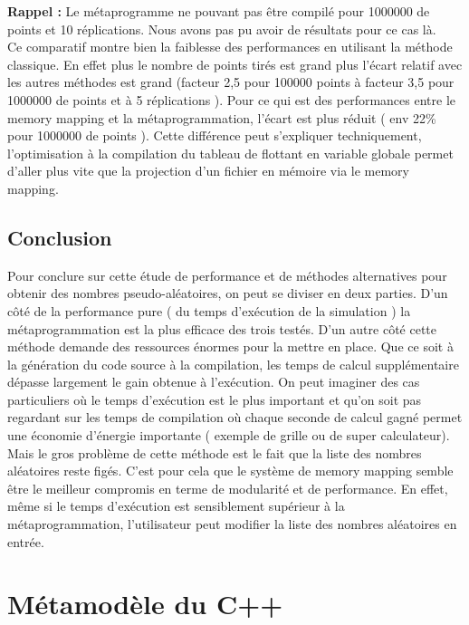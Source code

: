 \documentclass[a4paper,11pt]{report}
\begin{document}
\normalsize{
{\bf Rappel :} Le métaprogramme ne pouvant pas être compilé pour 1000000 de points et 10 réplications. Nous avons pas pu avoir de résultats pour ce cas là. \\

Ce comparatif montre bien la faiblesse des performances en utilisant la méthode classique. En effet plus le nombre de points tirés est grand plus l'écart relatif avec les autres méthodes est grand (facteur 2,5 pour 100000 points à  facteur 3,5 pour 1000000 de points et à 5 réplications ). Pour ce qui est des performances entre le memory mapping et la métaprogrammation, l'écart est plus réduit ( env 22\% pour 1000000 de points ). Cette différence peut s'expliquer techniquement, l'optimisation à la compilation du tableau de flottant en variable globale permet d'aller plus vite que la projection d'un fichier en mémoire via le memory mapping. 
}

\section{Conclusion}

\normalsize{
Pour conclure sur cette étude de performance et de méthodes alternatives pour obtenir des nombres pseudo-aléatoires, on peut se diviser en deux parties. D'un côté de la performance pure ( du temps d'exécution de la simulation ) la métaprogrammation est la plus efficace des trois testés. D'un autre côté cette méthode demande des ressources énormes pour la mettre en place. Que ce soit à la génération du code source à la compilation, les temps de calcul supplémentaire dépasse largement le gain obtenue à l'exécution. On peut imaginer des cas particuliers où le temps d'exécution est le plus important et qu'on soit pas regardant sur les temps de compilation  où chaque seconde de calcul gagné permet une économie d'énergie importante ( exemple de grille ou de super calculateur). Mais le gros problème de cette méthode est le fait que la liste des nombres aléatoires reste figés. C'est pour cela que le système de memory mapping semble être le meilleur compromis en terme de modularité et de performance. En effet, même si le temps d'exécution est sensiblement supérieur à la métaprogrammation, l'utilisateur peut modifier la liste des nombres aléatoires en entrée.  
}

\chapter{Métamodèle du C++}
\end{document}
